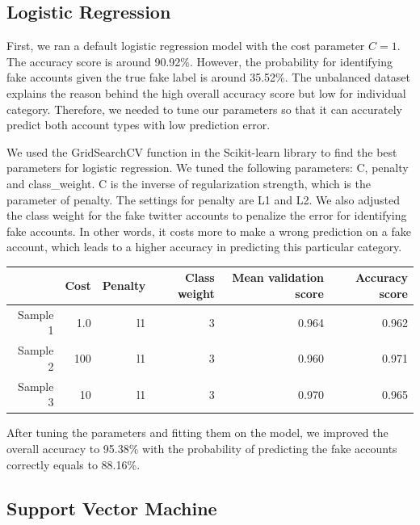 \documentclass[a4paper, 12pt]{report}
\begin{document}
\subsection*{Logistic Regression}
First, we ran a default logistic regression model with the cost parameter $C=1$. The accuracy score is around 90.92\%. However, the probability for identifying fake accounts given the true fake label is around 35.52\%. The unbalanced dataset explains the reason behind the high overall accuracy score but low for individual category. Therefore, we needed to tune our parameters so that it can accurately predict both account types with low prediction error. 

\noindent We used the GridSearchCV function in the Scikit-learn library to find the best parameters for logistic regression. We tuned the following parameters: C, penalty and class\_weight. C is the inverse of regularization strength, which is the parameter of penalty. The settings for penalty are L1 and L2. We also adjusted the class weight for the fake twitter accounts to penalize the error for identifying fake accounts. In other words, it costs more to make a wrong prediction on a fake account, which leads to a higher accuracy in predicting this particular category. 

\begin{table}[h!]
	 \label{tab:title} 
	\begin{center}
		\begin{tabular}{rrrrrr}
			\hline
			& Cost & Penalty & Class weight & Mean validation score & Accuracy score\\
			\hline
			Sample 1 & 1.0 & l1 & 3 & 0.964 & 0.962\\
			Sample 2 & 100 & l1 & 3 & 0.960 & 0.971\\
			Sample 3 & 10  & l1 & 3 & 0.970 & 0.965\\
			\hline
		\end{tabular}
	\end{center}
\end{table}

\noindent After tuning the parameters and fitting them on the model, we improved the overall accuracy to 95.38\% with the probability of predicting the fake accounts correctly equals to 88.16\%.

\subsection*{Support Vector Machine}
\end{document}

